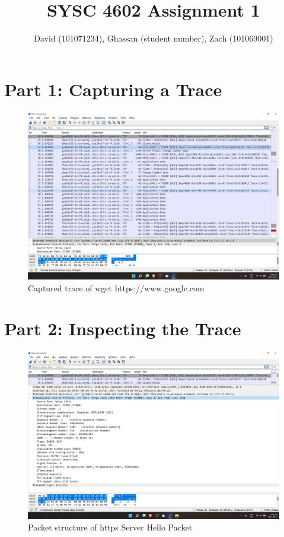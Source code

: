 \documentclass{report}
\begin{document}
    \title  { \textbf{SYSC 4602 Assignment 1} }
    \author {
        David (101071234),
        Ghassan (student number),
        Zach (101069001)
    }

    \maketitle

    \chapter*{Part 1: Capturing a Trace}
    \begin{figure}[h]
        \includegraphics[width=\textwidth]{images/trace-https.png}
        \caption{Captured trace of wget https://www.google.com}
    \end{figure}

    \chapter*{Part 2: Inspecting the Trace}
    \begin{figure}[h]
        \includegraphics[width=\textwidth]{images/https-server-hello-structure-1.png}
        \caption{Packet structure of https Server Hello Packet}
    \end{figure}
\end{document}
